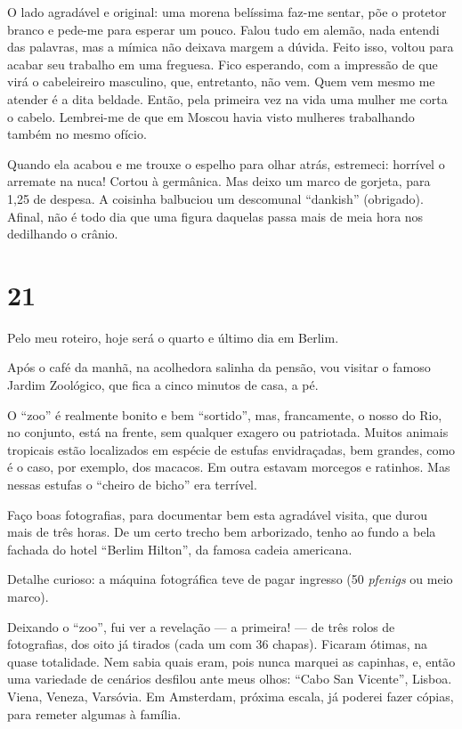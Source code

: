 O lado agradável e original: uma morena belíssima faz-me sentar, põe o protetor branco e pede-me para esperar um pouco. Falou tudo em alemão, nada entendi das palavras, mas a mímica não deixava margem a dúvida. Feito isso, voltou para acabar seu trabalho em uma freguesa. Fico esperando, com a impressão de que virá o cabeleireiro masculino, que, entretanto, não vem. Quem vem mesmo me atender é a dita beldade. Então, pela primeira vez na vida uma mulher me corta o cabelo. Lembrei-me de que em Moscou havia visto mulheres trabalhando também no mesmo ofício.

Quando ela acabou e me trouxe o espelho para olhar atrás, estremeci: horrível o arremate na nuca! Cortou à germânica. Mas deixo um marco de gorjeta, para 1,25 de despesa. A coisinha balbuciou um descomunal ``dankish'' (obrigado). Afinal, não é todo dia que uma figura daquelas passa mais de meia hora nos dedilhando o crânio.

\section*{21 \adfflatleafright {}}
Pelo meu roteiro, hoje será o quarto e último dia em Berlim.

Após o café da manhã, na acolhedora salinha da pensão, vou visitar o famoso Jardim Zoológico, que fica a cinco minutos de casa, a pé.

O ``zoo'' é realmente bonito e bem ``sortido'', mas, francamente, o nosso do Rio, no conjunto, está na frente, sem qualquer exagero ou patriotada. Muitos animais tropicais estão localizados em espécie de estufas envidraçadas, bem grandes, como é o caso, por exemplo, dos macacos. Em outra estavam morcegos e ratinhos. Mas nessas estufas o ``cheiro de bicho'' era terrível.

Faço boas fotografias, para documentar bem esta agradável visita, que durou mais de três horas. De um certo trecho bem arborizado, tenho ao fundo a bela fachada do hotel ``Berlim Hilton'', da famosa cadeia americana.

Detalhe curioso: a máquina fotográfica teve de pagar ingresso (50 \textit{pfenigs} ou meio marco).

Deixando o ``zoo'', fui ver a revelação --- a primeira! --- de três rolos de fotografias, dos oito já tirados (cada um com 36 chapas). Ficaram ótimas, na quase totalidade. Nem sabia quais eram, pois nunca marquei as capinhas, e, então uma variedade de cenários desfilou ante meus olhos: ``Cabo San Vicente'', Lisboa. Viena, Veneza, Varsóvia. Em Amsterdam, próxima escala, já poderei fazer cópias, para remeter algumas à família.

